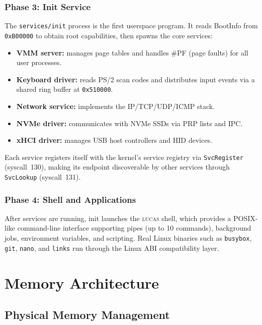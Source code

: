 \documentclass[11pt,a4paper,twoside]{report}
\theoremstyle{definition}
\newcommand{\LUCAS}{\textsc{lucas}}
\newcommand{\syscall}[1]{\texttt{#1}}
\newcommand{\hex}[1]{\texttt{0x#1}}
\newcommand{\file}[1]{\texttt{#1}}
\begin{document}
\subsection{Phase 3: Init Service}

The \file{services/init} process is the first userspace program. It reads
BootInfo from \hex{B00000} to obtain root capabilities, then spawns the
core services:

\begin{itemize}[leftmargin=1.4em]
  \item \textbf{VMM server:} manages page tables and handles \#PF
    (page faults) for all user processes.
  \item \textbf{Keyboard driver:} reads PS/2 scan codes and distributes
    input events via a shared ring buffer at \hex{510000}.
  \item \textbf{Network service:} implements the IP/TCP/UDP/ICMP stack.
  \item \textbf{NVMe driver:} communicates with NVMe SSDs via PRP lists
    and IPC.
  \item \textbf{xHCI driver:} manages USB host controllers and HID
    devices.
\end{itemize}

Each service registers itself with the kernel's service registry via
\syscall{SvcRegister} (syscall~130), making its endpoint discoverable by
other services through \syscall{SvcLookup} (syscall~131).

\subsection{Phase 4: Shell and Applications}

After services are running, init launches the \LUCAS{} shell, which provides
a POSIX-like command-line interface supporting pipes (up to 10 commands),
background jobs, environment variables, and scripting. Real Linux binaries
such as \texttt{busybox}, \texttt{git}, \texttt{nano}, and \texttt{links}
run through the Linux ABI compatibility layer.


\chapter{Memory Architecture}
\label{ch:memory}

\section{Physical Memory Management}
\end{document}
